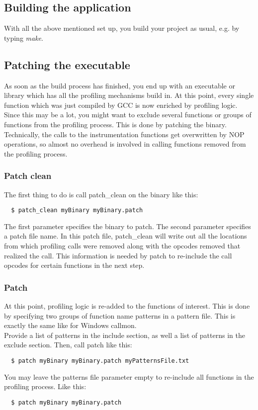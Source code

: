 \subsection{Building the application} With all the above mentioned set up, you build your project as usual, e.g. by typing \emph{make}.

\subsection{Patching the executable} As soon as the build process has finished, you end up with an executable or library which has all the profiling mechanisms build in. At this point, every single function which was just compiled by GCC is now enriched by profiling logic. Since this may be a lot, you might want to exclude several functions or groups of functions from the profiling process. This is done by patching the binary. Technically, the calls to the instrumentation functions get overwritten by NOP operations, so almost no overhead is involved in calling functions removed from the profiling process.

\subsubsection{Patch clean} The first thing to do is call patch\_clean on the binary like this:
\begin{verbatim}
  $ patch_clean myBinary myBinary.patch
\end{verbatim}
The first parameter specifies the binary to patch. The second parameter specifies a patch file name. In this patch file, patch\_clean will write out all the locations from which profiling calls were removed along with the opcodes removed that realized the call. This information is needed by patch to re-include the call opcodes for certain functions in the next step.

\subsubsection{Patch} At this point, profiling logic is re-added to the functions of interest. This is done by specifying two groups of function name patterns in a pattern file. This is exactly the same like for Windows callmon.\\

Provide a list of patterns in the include section, as well a list of patterns in the exclude section. Then, call patch like this:
\begin{verbatim}
  $ patch myBinary myBinary.patch myPatternsFile.txt
\end{verbatim}
You may leave the patterns file parameter empty to re-include all functions in the profiling process. Like this:
\begin{verbatim}
  $ patch myBinary myBinary.patch
\end{verbatim}

